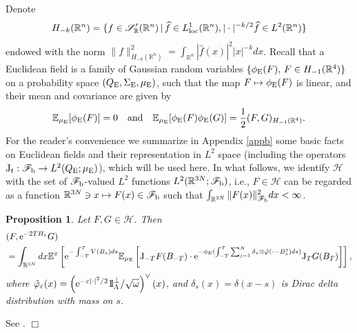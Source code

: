 \documentclass[12pt]{article}
\newtheorem{proposition}[theorem]{Proposition}
\providecommand{\bp}[1]{\begin{proposition}\label{#1}}
\providecommand{\ep}{\end{proposition}}
\def\bbbone{{\mathchoice {\rm 1\mskip-4mu l} {\rm 1\mskip-4mu l}
{\rm 1\mskip-4.5mu l} {\rm 1\mskip-5mu l}}}
\def\one{\bbbone}
\newcommand{\Ebb}{{\mathbb E}}
\providecommand{\eq}[1]{\begin{equation}\label{#1}}
\providecommand{\en}{\end{equation}}
\renewcommand{\d}{\displaystyle}
\providecommand{\qed}{\hfill {$\Box$}\par\medskip}
\providecommand{\BRN}{{\mathbb{R}^{3N} }}
\providecommand{\RR}{\mathbb{R}}
\providecommand{\ms}[1]{\mathscr{#1}}
\providecommand{\ffff}{{\mathscr{F}_{\rm b}}}
\providecommand{\lk}{\left(}
\providecommand{\rk}{\right)}
\providecommand{\JJ}{{\rm J}}
\providecommand{\half}{\frac{1}{2}}
\providecommand{\La}{{\Lambda}}
\providecommand{\hhh}{\ms H} %
\providecommand{\non}{\nonumber}
\providecommand{\e}{{\rm e}}
\providecommand{\1}{\mathbb{1}}
\providecommand{\eps}{\varepsilon}
\begin{document}
Denote
\eq{yoshida}
H_{-k}(\RR^n)=\{f\in \ms S_\RR'(\RR^n)\,|\,\widehat f\in L_{\rm loc}^1(\RR^n), |\cdot|^{-k/2}\widehat f\in
L^2(\RR^n)\}
\en
endowed with the norm $\d \|f\|_{H_{-k}(\RR^n)}^2=\int_{\RR^n} |\widehat f(x)|^2|x|^{-k} dx$. Recall that a
Euclidean field is a family of Gaussian random variables $\{\phi_{\rm E}(F), \, F\in H_{-1}(\RR^4)\}$ on a
probability space $(Q_{\rm E}, \Sigma_{\rm E}, \mu_{\rm E})$, such that the map $F \mapsto \phi_{\rm E}(F)$
is linear, and their mean and covariance are given by
$$
\Ebb_{\mu_{\rm E}}[\phi_{\rm E}(F)]=0 \quad \mbox{and} \quad \Ebb_{\mu_{\rm E}}[\phi_{\rm E}(F)
\phi_{\rm E}(G)]=\half (F,G)_{H_{-1}(\RR^4)}.
$$
For the reader's convenience we summarize in  Appendix \ref{appb} some basic facts on Euclidean fields and
their representation in $L^2$ space (including the operators $\JJ_t:\ffff \to L^2(Q_{\rm E};\mu_{\rm E})$),
which will be used here. In what follows, we identify $\hhh$ with the set of $\ffff $-valued $L^2$ functions
$L^2(\RR^{3N};\ffff )$, i.e., $F\in \hhh$ can  be regarded as a function  $\RR^{3N}\ni x\mapsto F(x)\in \ffff $
such that $\int_{\RR^{3N}}\|F(x)\|^2_\ffff  dx<\infty$.
\bp{FKF}
Let $F, G\in\hhh$. Then
\begin{align}
&(F, \e^{-2TH_\eps}G)\non\\
&\label{fkf}
=\int_{\BRN} dx  \Ebb^x \left[\e^{-\int_{-T}^T V(B_s) ds} \Ebb_{\mu_{\rm E}} \left[\JJ_{-T} F(B_{-T})\cdot
\e^{-\phi_{\rm E}(\int_{-T}^T\sum_{j=1}^N \delta_s\otimes \tilde\varphi(\cdot-B_s^j) ds)} \JJ_TG(B_T)\right]\right],
\end{align}
where $\tilde \varphi_\eps(x)=\lk \e^{-\eps|\cdot|^2/2}\one_\La^\perp /\sqrt{\omega}\rk^\vee{}(x)$, and $\delta_s(x) =
\delta(x-s)$ is Dirac delta distribution with mass on $s$.
\ep
\proof
See \cite[Theorem 6.3]{lhb11}.
\qed
\end{document}
